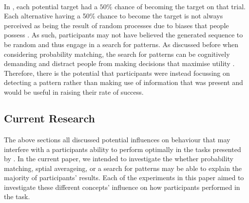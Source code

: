 \documentclass[12pt]{article}
\begin{document}
\paragraph{} In \cite{clarke2015failure}, each potential target had a $50\%$ chance of becoming the target on that trial. Each alternative having a 50\% chance to become the target is not always perceived as being the result of random processes due to biases that people possess \citep{Ayton2004}. As such, participants may not have believed the generated sequence to be random and thus engage in a search for patterns. As discussed before when considering probability matching, the search for patterns can be cognitively demanding and distract people from making decisions that maximise utility \citep{wolford2004searching}. Therefore, there is the potential that participants were instead focussing on detecting a pattern rather than making use of information that was present and would be useful in raising their rate of success. 


\subsection*{Current Research}

\paragraph{} The above sections all discussed potential influences on behaviour that may interfere with a participants ability to perform optimally in the tasks presented by \cite{clarke2015failure}. In the current paper, we intended to investigate the whether probability matching, sptial averageing, or a search for patterns may be able to explain the majority of participants' results. Each of the experiments in this paper aimed to investigate these different concepts' influence on how participants performed in the task. 
\end{document}
